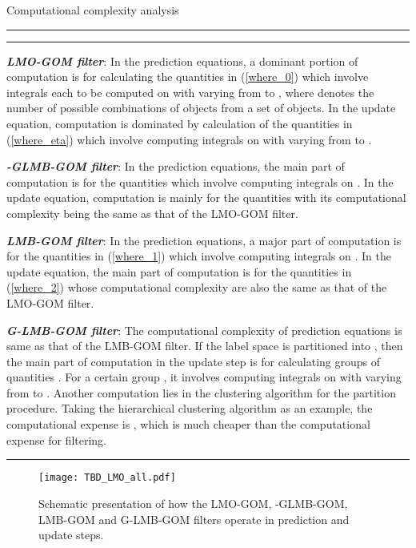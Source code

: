 \documentclass[journal]{IEEEtran}
\begin{document}
{\begin{table}[h]
\caption{Computational complexity analysis}
\hrule\vspace{0.7mm}\hrule
\vspace{2mm}

\textit{\textbf{LMO-GOM filter}}:  In the prediction equations, a dominant portion of computation is for calculating the quantities  in (\ref{where_0}) which involve  integrals each to be computed on  with  varying from  to , where   denotes the number of possible combinations of  objects from a set of  objects. In the update equation, computation is dominated by calculation of the quantities  in (\ref{where_eta}) which involve computing  integrals on  with  varying from  to . 
\vspace{2mm}


\textit{\textbf{-GLMB-GOM filter}}:  In the prediction equations, the main part of computation is for the quantities  which involve computing  integrals on  . In the update equation, computation is mainly for the quantities  with its computational complexity being the same as that of the LMO-GOM filter. 
\vspace{2mm}


\textit{\textbf{LMB-GOM filter}}:  In the prediction equations, a major part of computation is for the quantities  in (\ref{where_1}) which involve computing  integrals on  . In the update equation, the main part of computation is for the quantities  in (\ref{where_2}) whose computational complexity are also the same as that of the LMO-GOM filter. 
\vspace{2mm}


\textit{\textbf{G-LMB-GOM filter}}:  The computational complexity of prediction equations is same as that of the LMB-GOM filter. If the label space  is  partitioned into , then  the main part of computation in the update step is for calculating  groups of  quantities . For a certain group ,  it involves computing  integrals on  with  varying from  to .  Another computation lies in the clustering algorithm  for the partition procedure. 
Taking the  hierarchical clustering    algorithm \cite{refr:clustering_method} as an example,
the computational expense  is , which is much cheaper than the computational expense for filtering.
\vspace{2mm}\hrule
\end{table}
\begin{figure}[t]
\centering
\texttt{[image: TBD\_LMO\_all.pdf]}\\
  \caption{Schematic presentation of how the LMO-GOM, -GLMB-GOM, LMB-GOM and G-LMB-GOM filters operate in  prediction and update steps.}
  \label{fig:flow}
\end{figure}

}
\end{document}
